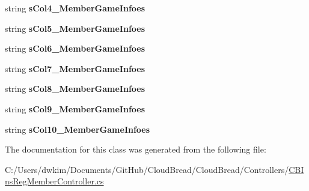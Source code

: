 \begin{DoxyCompactItemize}
\item 
string {\bfseries s\+Col4\+\_\+\+Member\+Game\+Infoes}\hypertarget{a00101_ad3ef11cb6d20fc6254f9f7f19eac2978}{}\label{a00101_ad3ef11cb6d20fc6254f9f7f19eac2978}

\item 
string {\bfseries s\+Col5\+\_\+\+Member\+Game\+Infoes}\hypertarget{a00101_a9267aea57a89d307b124de2e4c2ca28e}{}\label{a00101_a9267aea57a89d307b124de2e4c2ca28e}

\item 
string {\bfseries s\+Col6\+\_\+\+Member\+Game\+Infoes}\hypertarget{a00101_acb69a7f286ab237b5cd514312126164d}{}\label{a00101_acb69a7f286ab237b5cd514312126164d}

\item 
string {\bfseries s\+Col7\+\_\+\+Member\+Game\+Infoes}\hypertarget{a00101_a95b5b8bbd575ff75a4aed5b58688d0ec}{}\label{a00101_a95b5b8bbd575ff75a4aed5b58688d0ec}

\item 
string {\bfseries s\+Col8\+\_\+\+Member\+Game\+Infoes}\hypertarget{a00101_a483124bc270bea748f6729cdcc8070ea}{}\label{a00101_a483124bc270bea748f6729cdcc8070ea}

\item 
string {\bfseries s\+Col9\+\_\+\+Member\+Game\+Infoes}\hypertarget{a00101_ac872d54a0e24f2337be5f264eb0cfe4c}{}\label{a00101_ac872d54a0e24f2337be5f264eb0cfe4c}

\item 
string {\bfseries s\+Col10\+\_\+\+Member\+Game\+Infoes}\hypertarget{a00101_a35f578b922f38aa8d3760e5f8c623fc3}{}\label{a00101_a35f578b922f38aa8d3760e5f8c623fc3}

\end{DoxyCompactItemize}


The documentation for this class was generated from the following file\+:\begin{DoxyCompactItemize}
\item 
C\+:/\+Users/dwkim/\+Documents/\+Git\+Hub/\+Cloud\+Bread/\+Cloud\+Bread/\+Controllers/\hyperlink{a00215}{C\+B\+Ins\+Reg\+Member\+Controller.\+cs}\end{DoxyCompactItemize}
